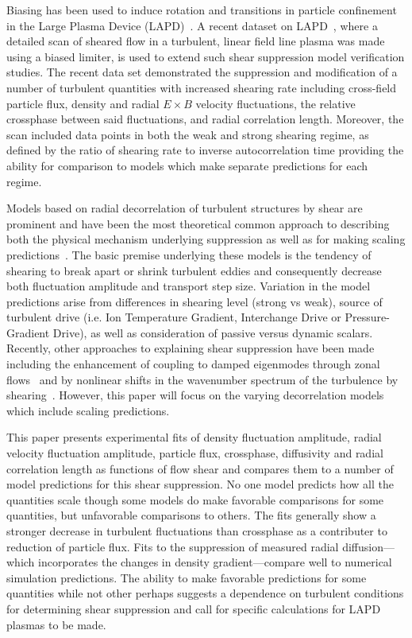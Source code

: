 \documentclass[aip,pop,amsmath,amssymb,preprint,superscriptaddress]{revtex4-1} %
\begin{document}
Biasing has been used to induce rotation and transitions in particle confinement in the Large Plasma Device (LAPD)~\cite{maggs07,carter09}. A recent dataset on LAPD~\cite{schaffner12}, where a detailed scan of sheared flow in a turbulent, linear field line plasma was made using a biased limiter,  is used to extend such shear suppression model verification studies. The recent data set demonstrated the suppression and modification of a number of turbulent quantities with increased shearing rate including cross-field particle flux, density and radial $E\times B$ velocity fluctuations, the relative crossphase between said fluctuations, and radial correlation length. Moreover, the scan included data points in both the weak and strong shearing regime, as defined by the ratio of shearing rate to inverse autocorrelation time providing the ability for comparison to models which make separate predictions for each regime.

Models based on radial decorrelation of turbulent structures by shear are prominent and have been the most theoretical common approach to describing both the physical mechanism underlying suppression as well as for making scaling predictions~\cite{terry00}. The basic premise underlying these models is the tendency of shearing to break apart or shrink turbulent eddies and consequently decrease both fluctuation amplitude and transport step size. Variation in the model predictions arise from differences in shearing level (strong vs weak), source of turbulent drive (i.e. Ion Temperature Gradient, Interchange Drive or Pressure-Gradient Drive), as well as consideration of passive versus dynamic scalars. Recently, other approaches to explaining shear suppression have been made including the enhancement of coupling to damped eigenmodes through zonal flows~\cite{terry06} and by nonlinear shifts in the wavenumber spectrum of the turbulence by shearing~\cite{staebler12}. However, this paper will focus on the varying decorrelation models which include scaling predictions. 

This paper presents experimental fits of density fluctuation amplitude, radial velocity fluctuation amplitude, particle flux, crossphase, diffusivity and radial correlation length as functions of flow shear and compares them to a number of model predictions for this shear suppression. No one model predicts how all the quantities scale though some models do make favorable comparisons for some quantities, but unfavorable comparisons to others. The fits generally show a stronger decrease in turbulent fluctuations than crossphase as a contributer to reduction of particle flux. Fits to the suppression of measured radial diffusion---which incorporates the changes in density gradient---compare well to numerical simulation predictions. The ability to make favorable predictions for some quantities while not other perhaps suggests a dependence on turbulent conditions for determining shear suppression and call for specific calculations for LAPD plasmas to be made.
\end{document}
